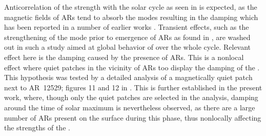 \documentclass{aa}
\begin{document}
Anticorrelation of the \fff strength with the solar cycle as seen in 
is expected, as the magnetic fields of ARs tend to absorb the modes resulting in the
\fff damping which has been reported in a number of earlier works
\citep{Cally+94,CB97,SRB16}. Transient effects, such as the strengthening of the mode
prior to emergence of ARs as found in \citet{SRB16}, are washed out in such a study aimed
at global behavior of \fff over the whole cycle. Relevant effect here is the damping
caused by the presence of ARs. This is a nonlocal effect where quiet patches in the
vicinity of ARs too display the damping of the \fff. This hypothesis was tested
by a detailed analysis of a magnetically quiet patch next to AR~12529; figures 11 and 12
in \citet{SRB16}. This is further established in the present work, where, though only the
quiet patches are selected in the analysis, damping around the time of solar maximum is
nevertheless observed, as there are a large number of ARs present on the surface during this
phase, thus nonlocally affecting the strengths of the \fff.

\end{document}
